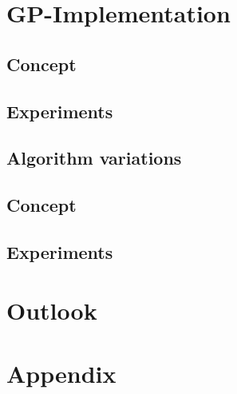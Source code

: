 \documentclass[11pt,a4paper]{article}
\begin{document}
\section*{GP-Implementation}
\subsection*{Concept}
\subsection*{Experiments}
\subsection*{Algorithm variations}
\subsection*{Concept}
\subsection*{Experiments}
\section*{Outlook}


\section*{Appendix}
\end{document}
